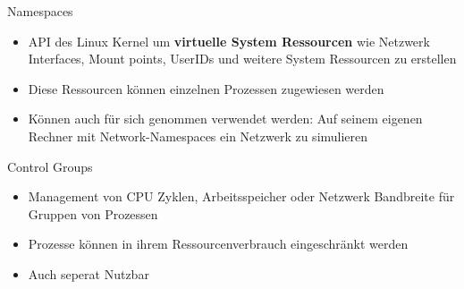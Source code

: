 \documentclass{beamer}
\begin{document}
  \begin{frame}{Namespaces}
    \begin{itemize}[<+->]
      \item API des Linux Kernel um \textbf{virtuelle System Ressourcen} wie Netzwerk Interfaces, Mount points, UserIDs und weitere System Ressourcen zu erstellen
      \item Diese Ressourcen können einzelnen Prozessen zugewiesen
werden
      \item Können auch für sich genommen verwendet werden: Auf seinem eigenen Rechner mit Network-Namespaces ein Netzwerk zu simulieren
    \end{itemize}
  \end{frame}
  
  \begin{frame}{Control Groups}
    \begin{itemize}[<+->]
      \item Management von CPU Zyklen, Arbeitsspeicher oder Netzwerk Bandbreite für Gruppen von Prozessen
      \item Prozesse können in ihrem Ressourcenverbrauch eingeschränkt werden
      \item Auch seperat Nutzbar
    \end{itemize}
  \end{frame}
  
\end{document}
